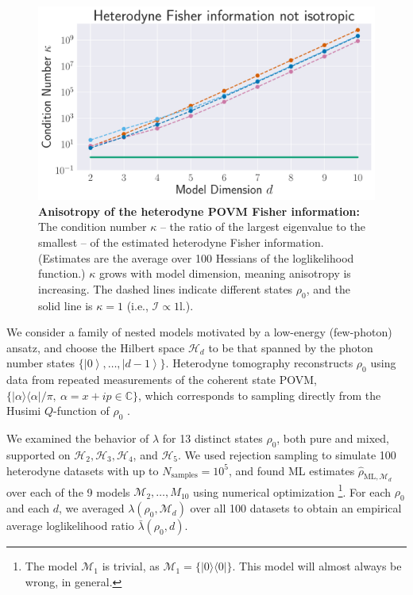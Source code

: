 \documentclass[aps,pra, twocolumn]{revtex4-1}
\newcommand{\M}{\mathcal{M}}
\newcommand{\Id}{\mathbb{I}}
\newcommand{\ket}[1]{\ensuremath{\left|#1\right\rangle}}
\def\Id{1\!\mathrm{l}}
\newcommand{\rhohat}{\hat{\rho}}
\newcommand{\rhoML}[1]{\rhohat_{\scriptscriptstyle{\mathrm{ML},#1}}}
\begin{document}
\begin{figure}
  \includegraphics[width=.9\columnwidth]{Images/Figure_10.pdf}
 \caption{\textbf{Anisotropy of the heterodyne POVM Fisher information:} The condition number $\kappa$ -- the ratio of the largest eigenvalue to the smallest -- of the estimated heterodyne Fisher information. (Estimates are the average over 100 Hessians of the loglikelihood function.) $\kappa$ grows with model dimension, meaning anisotropy is increasing.  The dashed lines indicate different states $\rho_{0}$, and the solid line is $\kappa = 1$ (i.e., $\mathcal{I} \propto \Id$.).}
\label{fig:fish_condition}
\end{figure}

We consider a family of nested models motivated by a low-energy (few-photon) ansatz, and choose   
the Hilbert space $\mathcal{H}_d$ to be that spanned by the photon number states $\{\ket{0},\ldots ,\ket{d-1}\}$.
Heterodyne tomography reconstructs $\rho_{0}$ using data from repeated measurements of the 
coherent state POVM, $\{|\alpha\rangle\langle \alpha| /\pi, ~\alpha=x+ip\in \mathbb{C}\}$, which corresponds to sampling directly from the Husimi $Q$-function of $\rho_{0}$ \cite{Husimi1940}.

We examined the behavior of $\lambda$ for 13 distinct states $\rho_{0}$, both pure and mixed, supported on $\mathcal{H}_{2}, \mathcal{H}_{3}, \mathcal{H}
_{4}$, and $\mathcal{H}_{5}$.  We used rejection sampling to simulate 100 heterodyne datasets with up to $N_{\mathrm{samples}}=10^5$, and found ML estimates $\rhoML{\M_{d}}$ over each of the 9 models $\M_2, \ldots, M_{10}$ using numerical optimization \footnote{The model $\M_{1}$ is trivial, as $\M_{1} = \{|0\rangle \langle 0|\}$. This model will almost always be wrong, in general.}.  For each $\rho_{0}$ and each $d$, we averaged $\lambda(\rho_{0}, \M_{d})$ over all 100 datasets to obtain an empirical average loglikelihood ratio $\bar{\lambda}(\rho_0,d)$.
\end{document}
